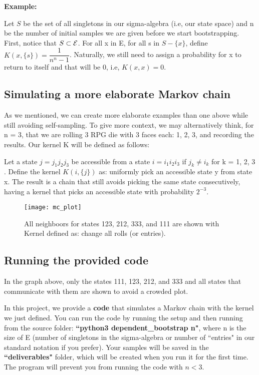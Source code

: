 \textbf{Example:}

Let $S$ be the set of all singletons in our sigma-algebra (i.e, our state space) and n be the number of initial samples we are given before we start bootstrapping. First, notice that $S \subset \mathcal{E}$.
For all x in E, for all s in $S - \{x\}$, define $K(x, \{s\}) = \dfrac{1}{n^n-1}$. Naturally, we still need to assign a probability for x to return to itself and that will be 0, i.e, $K(x,x) = 0$.

\subsection{Simulating a more elaborate Markov chain}

As we mentioned, we can create more elaborate examples than one above while still avoiding self-sampling. To give more context, we may alternatively think, for n = 3, that we are rolling 3 RPG die with 3 faces each: 1, 2, 3, and recording the results. Our kernel K will be defined as follows:

Let a state $j = j_1j_2j_3$ be accessible from a state $i = i_1i_2i_3$ if $j_k \neq i_k$ for k = 1, 2, 3 . Define the kernel $K(i, \{j\})$ as: uniformly pick an accessible state y from state x. The result is a chain that still avoids picking the same state consecutively, having a kernel that picks an accessible state with probability $2^{-3}$.

\begin{figure}
  \centering
	{\texttt{[image: mc\_plot]}}
	  \caption{All neighboors for states 123, 212, 333, and 111 are shown with Kernel defined as: change all rolls (or entries).}
\end{figure}


\subsection{Running the provided code}
In the graph above, only the states 111, 123, 212, and 333 and all states that communicate with them are shown to avoid a crowded plot.

In this project, we provide a \textbf{code} that simulates a Markov chain with the kernel we just defined. You can run the code by running the setup and then running from the source folder: \textbf{``python3 dependent\_bootstrap n"}, where n is the size of E (number of singletons in the sigma-algebra or number of ``entries" in our standard notation if you prefer). Your samples will be saved in the \textbf{``deliverables"} folder, which will be created when you run it for the first time. The program will prevent you from running the code with $n < 3$.


